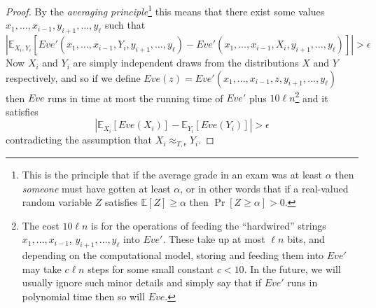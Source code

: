\begin{proof}
By the \emph{averaging principle}\footnote{This is the principle that if
  the average grade in an exam was at least \(\alpha\) then
  \emph{someone} must have gotten at least \(\alpha\), or in other words
  that if a real-valued random variable \(Z\) satisfies
  \({\mathbb{E}}[Z] \geq \alpha\) then \(\Pr[Z\geq \alpha]>0\).} this
means that there exist some values
\(x_1,\ldots,x_{i-1},y_{i+1},\ldots,y_\ell\) such that
\begin{equation*}
\left|{\mathbb{E}}_{X_i,Y_i}\left[ Eve'(x_1,\ldots,x_{i-1},Y_i,y_{i+1},\ldots,y_\ell) -  Eve'(x_1,\ldots,x_{i-1},X_i,y_{i+1},\ldots,y_\ell) \right]\right|>\epsilon
\end{equation*}
Now \(X_i\) and \(Y_i\) are simply independent draws from the
distributions \(X\) and \(Y\) respectively, and so if we define
\(Eve(z) = Eve'(x_1,\ldots,x_{i-1},z,y_{i+1},\ldots,y_\ell)\) then
\(Eve\) runs in time at most the running time of \(Eve'\) plus
\(10\ell n\)\footnote{The cost \(10 \ell n\) is for the operations of
  feeding the ``hardwired'' strings \(x_1,\ldots,x_{i-1}\),
  \(y_{i+1},\ldots,y_\ell\) into \(Eve'\). These take up at most
  \(\ell n\) bits, and depending on the computational model, storing and
  feeding them into \(Eve'\) may take \(c\ell n\) steps for some small
  constant \(c<10\). In the future, we will usually ignore such minor
  details and simply say that if \(Eve'\) runs in polynomial time then
  so will \(Eve\).} and it satisfies
\begin{equation*}
\left| {\mathbb{E}}_{X_i} [ Eve(X_i) ] - {\mathbb{E}}_{Y_i} [ Eve(Y_i) ] \right| > \epsilon
\end{equation*}
contradicting the assumption that \(X_i \approx_{T,\epsilon} Y_i\).

\end{proof}

\hypertarget{hybridrem}{}

